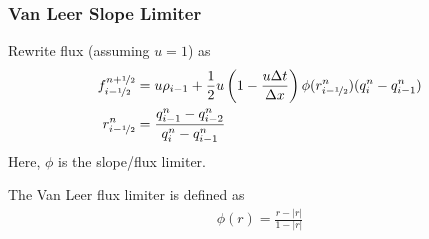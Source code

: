 
\begin{frame}
	\frametitle{Van Leer Slope Limiter}
	Rewrite flux (assuming $u = 1$) as
	\begin{align*}
		f_{i-\nicefrac{1}{2}}^{n+\nicefrac{1}{2}} &= u \rho_{i-1} + \frac{1}{2} u \left( 1 - \frac{u\Delta t}{\Delta x} \right) \phi(r_{i-\nicefrac{1}{2}}^n) (q_i^n - q_{i-1}^n)\\
		r_{i-\nicefrac{1}{2}}^n &= \frac{q_{i-1}^n - q_{i-2}^n}{q_i^n - q_{i-1}^n}
	\end{align*}
	Here, $\phi$ is the slope/flux limiter.
	
	The Van Leer flux limiter is defined as
	\begin{align*}
		\phi(r) = \frac{r - |r|}{1 - |r|}
	\end{align*}
\end{frame}







